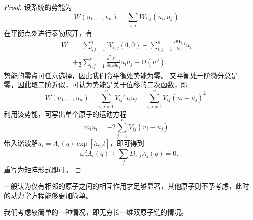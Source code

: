 \begin{proof}
    设系统的势能为
    \begin{equation}
        W(u_1, \dots, u_n) = \sum_{i,j} W_{i,j} (u_i, u_j)
    \end{equation}
    在平衡点处进行泰勒展开，有
    \begin{equation}
        \begin{aligned}
            W &= \sum_{i,j=1}^n W_{i,j}(0,0) + \sum_{i,j=1}^n \frac{\partial W_{i,j}}{\partial u_i} u_i \\
            &+ \frac{1}{2} \sum_{i,j=1}^n \frac{\partial^2 W_{i,j}}{\partial u_i \partial u_j} u_i u_j + O(u^3).
        \end{aligned}
    \end{equation}
    势能的零点可任意选择，因此我们令平衡处势能为零。
    又平衡处一阶微分总是零，因此取二阶近似，可认为势能是关于位移的二次函数，即
    \begin{equation}
        W(u_1, \dots, u_n) = \sum_{i,j=1}^n V_{ij}' u_i u_j  = \sum_{i,j=1}^n V_{ij} (u_i - u_j)^2.
    \end{equation}
    利用该势能，可写出单个原子的运动方程
    \begin{equation}
        m_i \ddot u_i = - 2 \sum_{j=1}^n V_{ij}(u_i - u_j)
    \end{equation}
    带入谐波解$u_i = A_i(q) \exp[i \omega_q t]$，即可得到
    \begin{equation}
        - \omega_q^2 A_i(q) + \sum_j D_{i,j} A_j(q) = 0.
    \end{equation}
    重写为矩阵形式即可。
\end{proof}

一般认为仅有相邻的原子之间的相互作用才足够显著，其他原子则不予考虑，此时的动力学方程能够更加简单。

我们考虑较简单的一种情况，即无穷长一维双原子链的情况。

